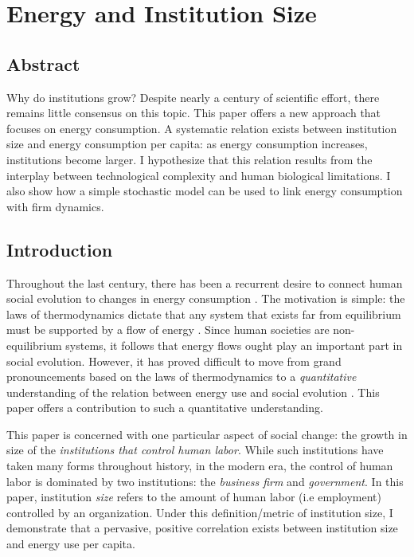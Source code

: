 
\chapter{Energy and Institution Size}
\label{Ch_energy}

\section*{Abstract}
Why do institutions grow? Despite nearly a century of scientific effort, there remains little consensus on this topic. This paper offers a new approach that focuses on energy consumption. A systematic relation exists between institution size and energy consumption per capita: as energy consumption increases, institutions become larger. I hypothesize that this relation results from the interplay between technological complexity and human biological limitations. I also show how a simple stochastic model can be used to link energy consumption with firm dynamics.



\section{Introduction}

Throughout the last century, there has been a recurrent desire to connect human social evolution to changes in energy consumption \cite{cottrell_energy_2009,hall_hydrocarbons_2003,soddy_virtual_1926,white_energy_1943}. The motivation is simple: the laws of thermodynamics dictate that any system that exists far from  equilibrium must be supported by a flow of energy \cite{kondepudi_modern_1998}.  Since human societies are non-equilibrium systems, it follows that energy flows ought play an important part in social evolution. However, it has proved difficult to move from grand pronouncements based on the laws of thermodynamics to a \emph{quantitative} understanding of the relation between energy use and social evolution \cite{adams_man_1978}. This paper offers a contribution to such a quantitative understanding.

This paper is concerned with one particular aspect of social change: the growth in size of the \textit{institutions that control human labor}. While such institutions have taken many forms throughout history, in the modern era, the control of human labor is dominated by two institutions: the \textit{business firm} and \textit{government}. In this paper, institution \textit{size} refers to the amount of human labor (i.e employment) controlled by an organization. Under this definition/metric of institution size, I demonstrate that a  pervasive, positive correlation exists between institution size and energy use per capita. 


